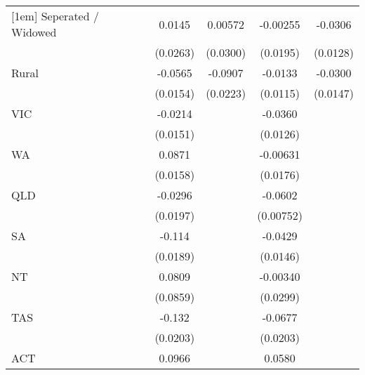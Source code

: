 {\begin{tabular}{l*{4}{c}}
[1em]
Seperated / Widowed &      0.0145         &     0.00572         &    -0.00255         &     -0.0306\sym{*}  \\
                    &    (0.0263)         &    (0.0300)         &    (0.0195)         &    (0.0128)         \\
[1em]
Rural               &     -0.0565\sym{***}&     -0.0907\sym{***}&     -0.0133         &     -0.0300\sym{*}  \\
                    &    (0.0154)         &    (0.0223)         &    (0.0115)         &    (0.0147)         \\
[1em]
VIC                 &     -0.0214         &                     &     -0.0360\sym{**} &                     \\
                    &    (0.0151)         &                     &    (0.0126)         &                     \\
[1em]
WA                  &      0.0871\sym{***}&                     &    -0.00631         &                     \\
                    &    (0.0158)         &                     &    (0.0176)         &                     \\
[1em]
QLD                 &     -0.0296         &                     &     -0.0602\sym{***}&                     \\
                    &    (0.0197)         &                     &   (0.00752)         &                     \\
[1em]
SA                  &      -0.114\sym{***}&                     &     -0.0429\sym{**} &                     \\
                    &    (0.0189)         &                     &    (0.0146)         &                     \\
[1em]
NT                  &      0.0809         &                     &    -0.00340         &                     \\
                    &    (0.0859)         &                     &    (0.0299)         &                     \\
[1em]
TAS                 &      -0.132\sym{***}&                     &     -0.0677\sym{***}&                     \\
                    &    (0.0203)         &                     &    (0.0203)         &                     \\
[1em]
ACT                 &      0.0966         &                     &      0.0580\sym{**} &                     \\

\end{tabular}}
